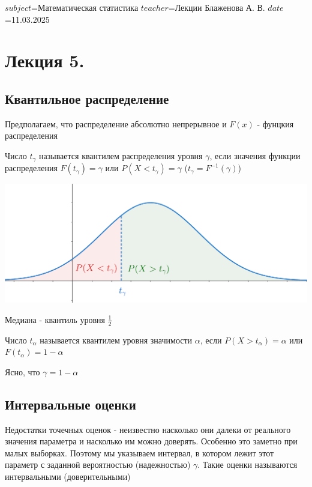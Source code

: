 $subject$=Математическая статистика
$teacher$=Лекции Блаженова А. В.
$date$=11.03.2025

\section{Лекция 5.}

\subsection{Квантильное распределение}

Предполагаем, что распределение абсолютно непрерывное и $F(x)$ - фунцкия распределения

 Число $t_\gamma$ называется квантилем распределения уровня $\gamma$, если значения
функции распределения $F(t_\gamma) = \gamma$ или $P(X < t_\gamma) = \gamma$ ($t_\gamma = F^{-1}(\gamma)$)


\begin{center}
    \includegraphics[width=15cm]{mathstat/images/mathstat_2025_03_11_1}
\end{center}

\Ex Медиана - квантиль уровня $\frac{1}{2}$

 Число $t_\alpha$ называется квантилем уровня значимости $\alpha$, если
$P(X > t_\alpha) = \alpha$ или $F(t_\alpha) = 1 - \alpha$

Ясно, что $\gamma = 1 - \alpha$

\subsection{Интервальные оценки}

Недостатки точечных оценок - неизвестно насколько они далеки от реального значения параметра и 
насколько им можно доверять. Особенно это заметно при малых выборках. Поэтому мы указываем интервал, в котором 
лежит этот параметр с заданной вероятностью (надежностью) $\gamma$. Такие оценки называются интервальными 
(доверительными)


